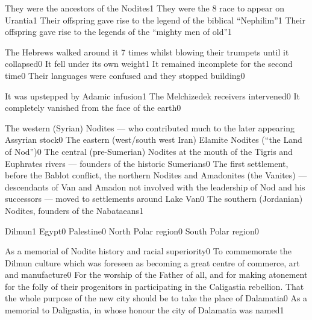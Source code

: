 {They were the ancestors of the Nodites}{1}
{They were the 8 race to appear on Urantia}{1}
{Their offspring gave rise to the legend of the biblical ``Nephilim''}{1}
{Their offspring gave rise to the legends of the ``mighty men of old''}{1}
\qstop

{The Hebrews walked around it 7 times whilst blowing their trumpets until it collapsed}{0}
{It fell under its own weight}{1}
{It remained incomplete for the second time}{0}
{Their languages were confused and they stopped building}{0}
\qstop

{It was upstepped by Adamic infusion}{1}
{The Melchizedek receivers intervened}{0}
{It completely vanished from the face of the earth}{0}
\qstop

{The western (Syrian) Nodites --- who contributed much to the later appearing Assyrian stock}{0}
{The eastern (west/south west Iran) Elamite Nodites (``the Land of Nod'')}{0}
{The central (pre-Sumerian) Nodites at the mouth of the Tigris and Euphrates rivers --- founders of the historic Sumerians}{0}
{The first settlement, before the Bablot conflict, the northern Nodites and Amadonites (the Vanites) --- descendants of Van and Amadon not involved with the leadership of Nod and his successors --- moved to settlements around Lake Van}{0}
{The southern (Jordanian) Nodites, founders of the Nabataeans}{1}
\qstop

{Dilmun}{1}
{Egypt}{0}
{Palestine}{0}
{North Polar region}{0}
{South Polar region}{0}
\qstop

{As a memorial of Nodite history and racial superiority}{0}
{To commemorate the Dilmun culture which was foreseen as becoming a great centre of commerce, art and manufacture}{0}
{For the worship of the Father of all, and for making atonement for the folly of their progenitors in participating in the Caligastia rebellion. That the whole purpose of the new city should be to take the place of Dalamatia}{0}
{As a memorial to Daligastia, in whose honour the city of Dalamatia was named}{1}
\qstop

